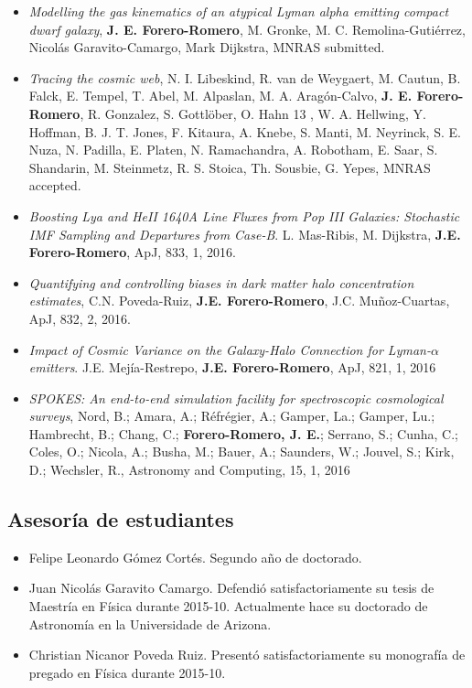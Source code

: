 \documentclass{article}
\begin{document}
\begin{itemize}

\item{\it Modelling the gas kinematics of an atypical Lyman alpha
emitting compact dwarf galaxy}, {\bf J. E. Forero-Romero}, M. Gronke, M. C. Remolina-Guti\'errez,
Nicol\'as Garavito-Camargo, Mark Dijkstra, MNRAS submitted. 

\item{\it Tracing the cosmic web}, N. I. Libeskind, R. van de Weygaert, M. Cautun, B. Falck, E.
Tempel, T. Abel, M. Alpaslan, M. A. Aragón-Calvo, {\bf
  J. E. Forero-Romero},  R. Gonzalez, S. Gottl\"ober, O. Hahn 13 ,
W. A. Hellwing, Y. Hoffman, B. J. T. Jones, F. Kitaura, A. Knebe,
S. Manti, M. Neyrinck, S. E. Nuza, N. Padilla, E. Platen,
N. Ramachandra, A. Robotham, E. Saar, S. Shandarin, M. Steinmetz,
R. S. Stoica, Th. Sousbie, G. Yepes, MNRAS accepted.  

\item{\it Boosting Lya and HeII 1640A Line Fluxes from Pop III
  Galaxies: Stochastic IMF Sampling and Departures from
  Case-B}. L. Mas-Ribis, M. Dijkstra, {\bf J.E. Forero-Romero},
  ApJ, 833, 1, 2016.

\item{\it Quantifying and controlling biases in dark matter halo
  concentration estimates}, C.N. Poveda-Ruiz, {\bf
  J.E. Forero-Romero}, J.C. Mu\~noz-Cuartas, ApJ, 832, 2, 2016. 

\item{\it Impact of Cosmic Variance on the Galaxy-Halo Connection
  for Lyman-$\alpha$ emitters}.  J.E. Mej\'ia-Restrepo, {\bf
  J.E. Forero-Romero}, ApJ, 821, 1, 2016

\item{\it SPOKES: An end-to-end simulation facility for
  spectroscopic cosmological surveys}, 
	Nord, B.; Amara, A.; R\'efr\'egier, A.; Gamper, La.; Gamper, Lu.;
        Hambrecht, B.; Chang, C.; {\bf Forero-Romero, J. E.}; Serrano, S.;
        Cunha, C.; Coles, O.; Nicola, A.; Busha, M.; Bauer, A.;
        Saunders, W.; Jouvel, S.; Kirk, D.; Wechsler, R., Astronomy
        and Computing, 15, 1, 2016
\end{itemize}

\subsection{Asesor\'ia de estudiantes}

\begin{itemize}
\item{Felipe Leonardo G\'omez Cort\'es. Segundo a\~no de doctorado.}
\item{Juan Nicol\'as Garavito Camargo. Defendi\'o satisfactoriamente
  su tesis de Maestr\'ia en F\'isica durante 2015-10. Actualmente hace su doctorado de
  Astronom\'ia en la Universidade de Arizona.}
\item{Christian Nicanor Poveda Ruiz. Present\'o satisfactoriamente su
  monograf\'ia de pregado en F\'isica durante 2015-10.}
\end{itemize}
\end{document}
